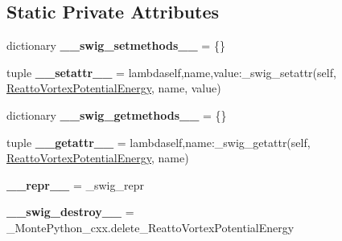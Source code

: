 \subsection*{Static Private Attributes}
\begin{DoxyCompactItemize}
\item 
\hypertarget{classMontePython__cxx_1_1ReattoVortexPotentialEnergy_a412ff80c1f154e0764f6ea111769a579}{}dictionary {\bfseries \+\_\+\+\_\+swig\+\_\+setmethods\+\_\+\+\_\+} = \{\}\label{classMontePython__cxx_1_1ReattoVortexPotentialEnergy_a412ff80c1f154e0764f6ea111769a579}

\item 
\hypertarget{classMontePython__cxx_1_1ReattoVortexPotentialEnergy_a49a03b69a870c09101ad4d1ce6a3d84e}{}tuple {\bfseries \+\_\+\+\_\+setattr\+\_\+\+\_\+} = lambdaself,name,value\+:\+\_\+swig\+\_\+setattr(self, \hyperlink{classMontePython__cxx_1_1ReattoVortexPotentialEnergy}{Reatto\+Vortex\+Potential\+Energy}, name, value)\label{classMontePython__cxx_1_1ReattoVortexPotentialEnergy_a49a03b69a870c09101ad4d1ce6a3d84e}

\item 
\hypertarget{classMontePython__cxx_1_1ReattoVortexPotentialEnergy_a7d2418a8f7a6e8678a5659ce11580a9c}{}dictionary {\bfseries \+\_\+\+\_\+swig\+\_\+getmethods\+\_\+\+\_\+} = \{\}\label{classMontePython__cxx_1_1ReattoVortexPotentialEnergy_a7d2418a8f7a6e8678a5659ce11580a9c}

\item 
\hypertarget{classMontePython__cxx_1_1ReattoVortexPotentialEnergy_ae29ebef45a93df967d6796948c9bde95}{}tuple {\bfseries \+\_\+\+\_\+getattr\+\_\+\+\_\+} = lambdaself,name\+:\+\_\+swig\+\_\+getattr(self, \hyperlink{classMontePython__cxx_1_1ReattoVortexPotentialEnergy}{Reatto\+Vortex\+Potential\+Energy}, name)\label{classMontePython__cxx_1_1ReattoVortexPotentialEnergy_ae29ebef45a93df967d6796948c9bde95}

\item 
\hypertarget{classMontePython__cxx_1_1ReattoVortexPotentialEnergy_a0faf1678f23572a0c4c79638467e115a}{}{\bfseries \+\_\+\+\_\+repr\+\_\+\+\_\+} = \+\_\+swig\+\_\+repr\label{classMontePython__cxx_1_1ReattoVortexPotentialEnergy_a0faf1678f23572a0c4c79638467e115a}

\item 
\hypertarget{classMontePython__cxx_1_1ReattoVortexPotentialEnergy_a76c1f29287ab1eb52a141ce8193e205e}{}{\bfseries \+\_\+\+\_\+swig\+\_\+destroy\+\_\+\+\_\+} = \+\_\+\+Monte\+Python\+\_\+cxx.\+delete\+\_\+\+Reatto\+Vortex\+Potential\+Energy\label{classMontePython__cxx_1_1ReattoVortexPotentialEnergy_a76c1f29287ab1eb52a141ce8193e205e}

\end{DoxyCompactItemize}


